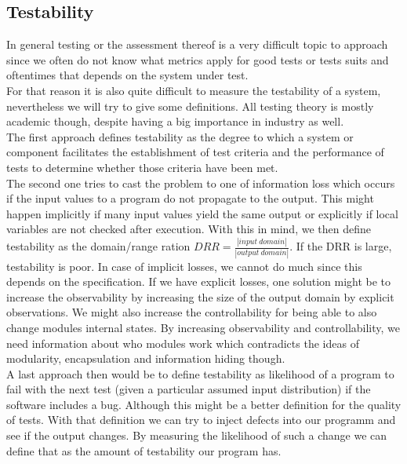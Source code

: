 \subsection{Testability}
In general testing or the assessment thereof is a very difficult topic to approach since we often do not know what metrics apply for good tests or tests suits and oftentimes that depends on the system under test.\\
For that reason it is also quite difficult to measure the testability of a system, nevertheless we will try to give some definitions.
All testing theory is mostly academic though, despite having a big importance in industry as well.\\

The first approach defines testability as the degree to which a system or component facilitates the establishment of test criteria and the performance of tests to determine whether those criteria have been met.\\

The second one tries to cast the problem to one of information loss which occurs if the input values to a program do not propagate to the output.
This might happen implicitly if many input values yield the same output or explicitly if local variables are not checked after execution.
With this in mind, we then define testability as the domain/range ration $DRR = \frac{|input~domain|}{|output~domain|}$.
If the DRR is large, testability is poor.
In case of implicit losses, we cannot do much since this depends on the specification.
If we have explicit losses, one solution might be to increase the observability by increasing the size of the output domain by explicit observations.
We might also increase the controllability for being able to also change modules internal states.
By increasing observability and controllability, we need information about who modules work which contradicts the ideas of modularity, encapsulation and information hiding though.\\

A last approach then would be to define testability as likelihood of a program to fail with the next test (given a particular assumed input distribution) if the software includes a bug.
Although this might be a better definition for the quality of tests.
With that definition we can try to inject defects into our programm and see if the output changes.
By measuring the likelihood of such a change we can define that as the amount of testability our program has.

